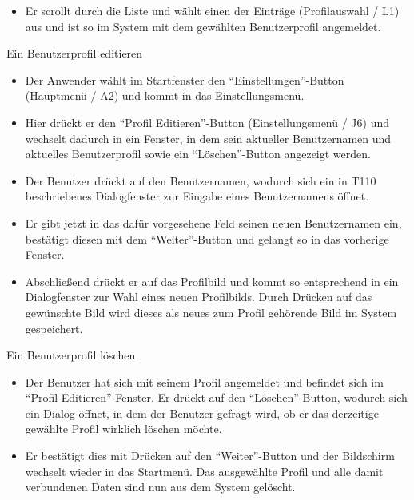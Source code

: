 \begin{requirements}
\begin{itemize}
  			\item Er scrollt durch die Liste und wählt einen der Einträge (Profilauswahl / L1) aus und ist so im System mit dem gewählten Benutzerprofil angemeldet.
  			
	\end{itemize}
  	
  	
	
	 Ein Benutzerprofil editieren
	
	
	\begin{itemize}
  			\item Der Anwender wählt im Startfenster den "`Einstellungen"'-Button (Hauptmenü / A2) und kommt in das Einstellungsmenü.
  			
  			\item Hier drückt er den "`Profil Editieren"'-Button (Einstellungsmenü / J6) und wechselt dadurch in ein Fenster, in dem sein aktueller Benutzernamen und aktuelles Benutzerprofil sowie ein "`Löschen"'-Button angezeigt werden.
  			
  			\item Der Benutzer drückt auf den Benutzernamen, wodurch sich ein in T110 beschriebenes Dialogfenster zur Eingabe eines Benutzernamens öffnet.
  			
  			\item Er gibt jetzt in das dafür vorgesehene Feld seinen neuen Benutzernamen ein, bestätigt diesen mit dem "`Weiter"'-Button und gelangt so in das vorherige Fenster.
  			
  			\item Abschließend drückt er auf das Profilbild und kommt so entsprechend in ein Dialogfenster zur Wahl eines neuen Profilbilds. Durch Drücken auf das gewünschte Bild wird dieses als neues zum Profil gehörende Bild im System gespeichert.
  			
  			
  	\end{itemize}

  	
	
	
	 Ein Benutzerprofil löschen
	
	
	\begin{itemize}
  			\item Der Benutzer hat sich mit seinem Profil angemeldet und befindet sich im "`Profil Editieren"'-Fenster.
			Er drückt auf den "`Löschen"'-Button, wodurch sich ein Dialog öffnet, in dem der Benutzer gefragt wird, ob er das derzeitige gewählte Profil wirklich löschen möchte.
  			
  			\item Er bestätigt dies mit Drücken auf den "`Weiter"'-Button und der Bildschirm wechselt wieder in das Startmenü. Das ausgewählte Profil und alle damit verbundenen Daten sind nun aus dem System gelöscht.
  			

\end{itemize}
\end{requirements}
